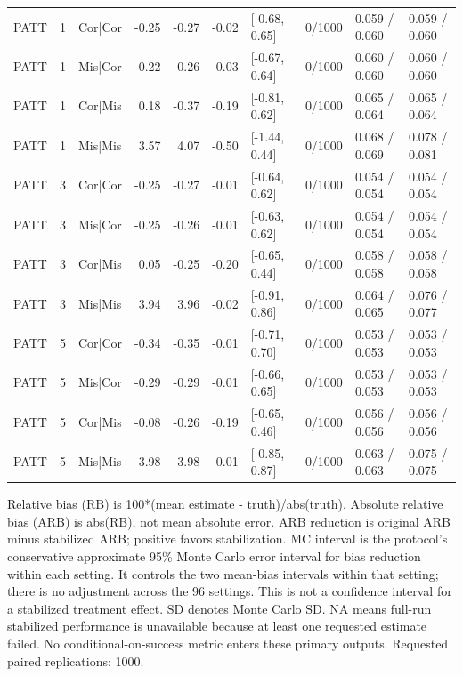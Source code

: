\begin{table}
\begin{tabular}{lllr r r l r l l}
PATT & 1 & Cor|Cor & -0.25 & -0.27 & -0.02 & [-0.68, 0.65] & 0/1000 & 0.059 / 0.060 & 0.059 / 0.060 \\
PATT & 1 & Mis|Cor & -0.22 & -0.26 & -0.03 & [-0.67, 0.64] & 0/1000 & 0.060 / 0.060 & 0.060 / 0.060 \\
PATT & 1 & Cor|Mis & 0.18 & -0.37 & -0.19 & [-0.81, 0.62] & 0/1000 & 0.065 / 0.064 & 0.065 / 0.064 \\
PATT & 1 & Mis|Mis & 3.57 & 4.07 & -0.50 & [-1.44, 0.44] & 0/1000 & 0.068 / 0.069 & 0.078 / 0.081 \\
PATT & 3 & Cor|Cor & -0.25 & -0.27 & -0.01 & [-0.64, 0.62] & 0/1000 & 0.054 / 0.054 & 0.054 / 0.054 \\
PATT & 3 & Mis|Cor & -0.25 & -0.26 & -0.01 & [-0.63, 0.62] & 0/1000 & 0.054 / 0.054 & 0.054 / 0.054 \\
PATT & 3 & Cor|Mis & 0.05 & -0.25 & -0.20 & [-0.65, 0.44] & 0/1000 & 0.058 / 0.058 & 0.058 / 0.058 \\
PATT & 3 & Mis|Mis & 3.94 & 3.96 & -0.02 & [-0.91, 0.86] & 0/1000 & 0.064 / 0.065 & 0.076 / 0.077 \\
PATT & 5 & Cor|Cor & -0.34 & -0.35 & -0.01 & [-0.71, 0.70] & 0/1000 & 0.053 / 0.053 & 0.053 / 0.053 \\
PATT & 5 & Mis|Cor & -0.29 & -0.29 & -0.01 & [-0.66, 0.65] & 0/1000 & 0.053 / 0.053 & 0.053 / 0.053 \\
PATT & 5 & Cor|Mis & -0.08 & -0.26 & -0.19 & [-0.65, 0.46] & 0/1000 & 0.056 / 0.056 & 0.056 / 0.056 \\
PATT & 5 & Mis|Mis & 3.98 & 3.98 & 0.01 & [-0.85, 0.87] & 0/1000 & 0.063 / 0.063 & 0.075 / 0.075 \\
\bottomrule
\end{tabular}
\vspace{0.5em}
\begin{minipage}{\textwidth}
\footnotesize
Relative bias (RB) is 100*(mean estimate - truth)/abs(truth). Absolute relative bias (ARB) is abs(RB), not mean absolute error. ARB reduction is original ARB minus stabilized ARB; positive favors stabilization. MC interval is the protocol's conservative approximate 95\% Monte Carlo error interval for bias reduction within each setting. It controls the two mean-bias intervals within that setting; there is no adjustment across the 96 settings. This is not a confidence interval for a stabilized treatment effect. SD denotes Monte Carlo SD. NA means full-run stabilized performance is unavailable because at least one requested estimate failed. No conditional-on-success metric enters these primary outputs. Requested paired replications: 1000.
\end{minipage}
\end{table}

